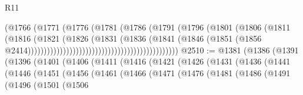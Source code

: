 \begin{lexlean}{R11}
\begin{coremodule}
{{{{{{{{{{{{{{{{{{{{{{{{{{{{{{{{{{{{{{{{{{{{{{{{{{{{{{{{{{{{{{{{{{{{{{{{{{{{{{{{{{{{{{{{{{{{{{{{{{{{{{{{{{                                                            (@1766
                                                              (@1771
                                                                (@1776
                                                                  (@1781
                                                                    (@1786
                                                                      (@1791
                                                                        (@1796
                                                                          (@1801
                                                                            (@1806
                                                                              (@1811
                                                                                (@1816
                                                                                  (@1821
                                                                                    (@1826
                                                                                      (@1831
                                                                                        (@1836
                                                                                          (@1841
                                                                                            (@1846
                                                                                              (@1851
                                                                                                (@1856
                                                                                                  @2414)))))))))))))))))))))))))))))))))))))))))))))))
@2510 := @1381
    (@1386
      (@1391
        (@1396
          (@1401
            (@1406
              (@1411
                (@1416
                  (@1421
                    (@1426
                      (@1431
                        (@1436
                          (@1441
                            (@1446
                              (@1451
                                (@1456
                                  (@1461
                                    (@1466
                                      (@1471
                                        (@1476
                                          (@1481
                                            (@1486
                                              (@1491
                                                (@1496
                                                  (@1501
                                                    (@1506
}}}}}}}}}}}}}}}}}}}}}}}}}}}}}}}}}}}}}}}}}}}}}}}}}}}}}}}}}}}}}}}}}}}}}}}}}}}}}}}}}}}}}}}}}}}}}}}}}}}}}}}}}}
\end{coremodule}
\end{lexlean}
